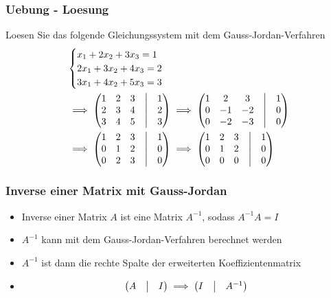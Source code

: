 \begin{frame}
    \frametitle{Uebung - Loesung}
    Loesen Sie das folgende Gleichungssystem mit dem Gauss-Jordan-Verfahren
    \begin{align*}
        &\begin{cases}
             x_1 + 2x_2 + 3x_3 = 1 \\
             2x_1 + 3x_2 + 4x_3 = 2 \\
             3x_1 + 4x_2 + 5x_3 = 3
        \end{cases} \\
        &\implies
        \begin{pmatrix}
            1 & 2 & 3 & \bigm| & 1 \\
            2 & 3 & 4 & \bigm| & 2 \\
            3 & 4 & 5 & \bigm| & 3
        \end{pmatrix}
        \implies
        \begin{pmatrix}
            1 & 2  & 3  & \bigm| & 1 \\
            0 & -1 & -2 & \bigm| & 0 \\
            0 & -2 & -3 & \bigm| & 0
        \end{pmatrix} \\
        &\implies
        \begin{pmatrix}
            1 & 2 & 3 & \bigm| & 1 \\
            0 & 1 & 2 & \bigm| & 0 \\
            0 & 2 & 3 & \bigm| & 0
        \end{pmatrix}
        \implies
        \begin{pmatrix}
            1 & 2 & 3 & \bigm| & 1 \\
            0 & 1 & 2 & \bigm| & 0 \\
            0 & 0 & 0 & \bigm| & 0
        \end{pmatrix}
    \end{align*}
\end{frame}

\begin{frame}
    \frametitle{Inverse einer Matrix mit Gauss-Jordan}
    \begin{itemize}
        \item Inverse einer Matrix $A$ ist eine Matrix $A^{-1}$, sodass $A^{-1}A = I$
        \item $A^{-1}$ kann mit dem Gauss-Jordan-Verfahren berechnet werden
        \item $A^{-1}$ ist dann die rechte Spalte der erweiterten Koeffizientenmatrix
        \item
        \begin{equation*}
            \begin{pmatrix}
                A & \bigm| & I
            \end{pmatrix}
            \implies
            \begin{pmatrix}
                I & \bigm| & A^{-1}
            \end{pmatrix}
        \end{equation*}
    \end{itemize}
\end{frame}

